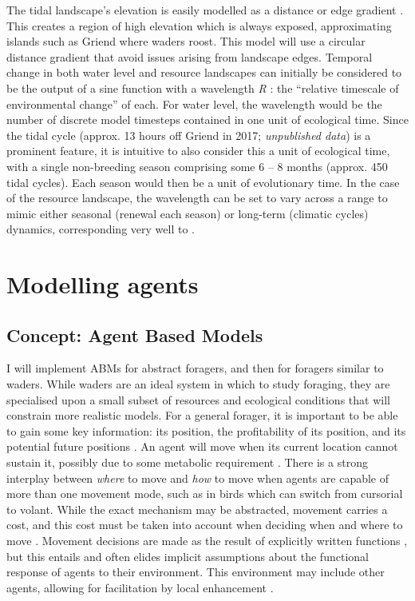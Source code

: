 The tidal landscape's elevation is easily modelled as a distance or edge gradient \citep{etherington2015}. This creates a region of high elevation which is always exposed, approximating islands such as Griend where waders roost. This model will use a circular distance gradient that avoid issues arising from landscape edges. Temporal change in both water level and resource landscapes can initially be considered to be the output of a sine function with a wavelength \emph{R} \citep[as in][]{botero2015}: the ``relative timescale of environmental change'' of each. For water level, the wavelength would be the number of discrete model timesteps contained in one unit of ecological time. Since the tidal cycle (approx. 13 hours off Griend in 2017; \emph{unpublished data}) is a prominent feature, it is intuitive to also consider this a unit of ecological time, with a single non-breeding season comprising some 6 -- 8 months (approx. 450 tidal cycles). Each season would then be a unit of evolutionary time. In the case of the resource landscape, the wavelength can be set to vary across a range to mimic either seasonal (renewal each season) or long-term (climatic cycles) dynamics, corresponding very well to \citet{botero2015}.

\section{Modelling agents}

\subsection{Concept: Agent Based Models}

I will implement ABMs for abstract foragers, and then for foragers similar to waders. While waders are an ideal system in which to study foraging, they are specialised upon a small subset of resources and ecological conditions that will constrain more realistic models. For a general forager, it is important to be able to gain some key information: its position, the profitability of its position, and its potential future positions \citep[\emph{why} and \emph{where} to move;][]{nathan2008a}. An agent will move when its current location cannot sustain it, possibly due to some metabolic requirement \citep{barraquand2008}. There is a strong interplay between \emph{where} to move and \emph{how} to move when agents are capable of more than one movement mode, such as in birds which can switch from cursorial to volant. While the exact mechanism may be abstracted, movement carries a cost, and this cost must be taken into account when deciding when and where to move \citep{charnov1976a}. Movement decisions are made as the result of explicitly written functions \citep[e.g.][]{getz2015}, but this entails and often elides implicit assumptions about the functional response of agents to their environment. This environment may include other agents, allowing for facilitation by local enhancement \citep{beauchamp2013}.

